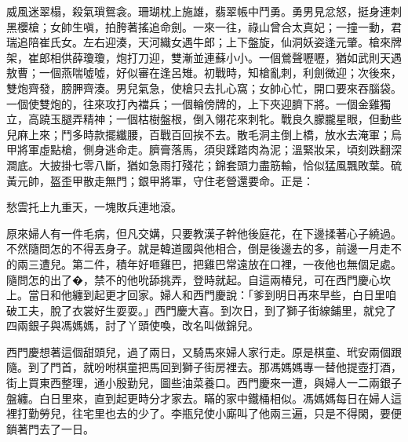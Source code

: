 威風迷翠榻，殺氣瑣鴛衾。珊瑚枕上施雄，翡翠帳中鬥勇。勇男見忿怒，挺身連刺黑櫻槍；女帥生嗔，拍胯著搖追命劍。一來一往，祿山曾合太真妃；一撞一動，君瑞追陪崔氏女。左右迎湊，天河織女遇牛郎；上下盤旋，仙洞妖姿逢元肇。槍來牌架，崔郎相供薛瓊瓊，炮打刀迎，雙漸並連蘇小小。一個鶯聲嚦嚦，猶如武則天遇敖曹；一個燕喘噓噓，好似審在逢呂雉。初戰時，知槍亂刺，利劍微迎；次後來，雙炮齊發，膀胛齊湊。男兒氣急，使槍只去扎心窩；女帥心忙，開口要來吞腦袋。一個使雙炮的，往來攻打內襠兵；一個輪傍牌的，上下夾迎臍下將。一個金雞獨立，高蹺玉腿弄精神；一個枯樹盤根，倒入翎花來刺牝。戰良久朦朧星眼，但動些兒麻上來；鬥多時款擺纖腰，百戰百回挨不去。散毛洞主倒上橋，放水去淹軍；烏甲將軍虛點槍，側身逃命走。臍膏落馬，須臾蹂踏肉為泥；溫緊妝呆，頃刻跌翻深澗底。大披掛七零八斷，猶如急雨打殘花；錦套頭力盡筋輸，恰似猛風飄敗葉。硫黃元帥，盔歪甲散走無門；銀甲將軍，守住老營還要命。正是：

愁雲托上九重天，一塊敗兵連地滾。

原來婦人有一件毛病，但凡交媾，只要教漢子幹他後庭花，在下邊揉著心子繞過。不然隨問怎的不得丟身子。就是韓道國與他相合，倒是後邊去的多，前邊一月走不的兩三遭兒。第二件，積年好咂雞巴，把雞巴常遠放在口裡，一夜他也無個足處。隨問怎的出了�，禁不的他吮舔挑弄，登時就起。自這兩椿兒，可在西門慶心坎上。當日和他纏到起更才回家。婦人和西門慶說：「爹到明日再來早些，白日里咱破工夫，脫了衣裳好生耍耍。」西門慶大喜。到次日，到了獅子街線鋪里，就兌了四兩銀子與馮媽媽，討了丫頭使喚，改名叫做錦兒。

西門慶想著這個甜頭兒，過了兩日，又騎馬來婦人家行走。原是棋童、玳安兩個跟隨。到了門首，就吩咐棋童把馬回到獅子街房裡去。那馮媽媽專一替他提壺打酒，街上買東西整理，通小殷勤兒，圖些油菜養口。西門慶來一遭，與婦人一二兩銀子盤纏。白日里來，直到起更時分才家去。瞞的家中鐵桶相似。馮媽媽每日在婦人這裡打勤勞兒，往宅里也去的少了。李瓶兒使小廝叫了他兩三遍，只是不得閑，要便鎖著門去了一日。

